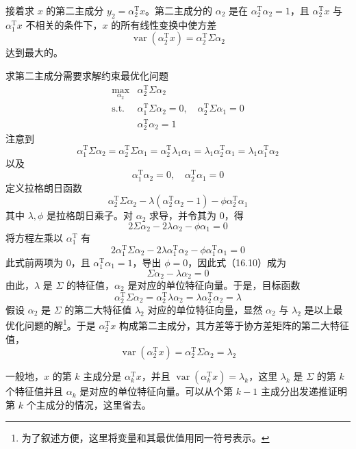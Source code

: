 \documentclass[UTF8, 12pt, fontset=fandol, oneside]{ctexart}
\begin{document}
接着求 $x$ 的第二主成分 $y_2=\alpha_2^{\mathrm{T}}x$。第二主成分的 $\alpha_2$ 是在 $\alpha_2^{\mathrm{T}}\alpha_2=1$，且 $\alpha_2^{\mathrm{T}}x$ 与 $\alpha_1^{\mathrm{T}}x$ 不相关的条件下，$x$ 的所有线性变换中使方差
\[
\operatorname{var}(\alpha_2^{\mathrm{T}}x)=\alpha_2^{\mathrm{T}}\Sigma\alpha_2
\]
达到最大的。

求第二主成分需要求解约束最优化问题
\begin{equation}
\begin{array}{ll}
\displaystyle\max_{\alpha_2} & \alpha_2^{\mathrm{T}}\Sigma\alpha_2\\[0.4em]
\mathrm{s.t.} & \alpha_1^{\mathrm{T}}\Sigma\alpha_2=0,\quad \alpha_2^{\mathrm{T}}\Sigma\alpha_1=0\\
& \alpha_2^{\mathrm{T}}\alpha_2=1
\end{array}
\tag{16.9}
\end{equation}
注意到
\[
\alpha_1^{\mathrm{T}}\Sigma\alpha_2=\alpha_2^{\mathrm{T}}\Sigma\alpha_1
=\alpha_2^{\mathrm{T}}\lambda_1\alpha_1
=\lambda_1\alpha_2^{\mathrm{T}}\alpha_1
=\lambda_1\alpha_1^{\mathrm{T}}\alpha_2
\]
以及
\[
\alpha_1^{\mathrm{T}}\alpha_2=0,\quad \alpha_2^{\mathrm{T}}\alpha_1=0
\]
定义拉格朗日函数
\[
\alpha_2^{\mathrm{T}}\Sigma\alpha_2-\lambda(\alpha_2^{\mathrm{T}}\alpha_2-1)-\phi\alpha_2^{\mathrm{T}}\alpha_1
\]
其中 $\lambda,\phi$ 是拉格朗日乘子。对 $\alpha_2$ 求导，并令其为 0，得
\begin{equation}
2\Sigma\alpha_2-2\lambda\alpha_2-\phi\alpha_1=0
\tag{16.10}
\end{equation}
将方程左乘以 $\alpha_1^{\mathrm{T}}$ 有
\[
2\alpha_1^{\mathrm{T}}\Sigma\alpha_2-2\lambda\alpha_1^{\mathrm{T}}\alpha_2-\phi\alpha_1^{\mathrm{T}}\alpha_1=0
\]
此式前两项为 0，且 $\alpha_1^{\mathrm{T}}\alpha_1=1$，导出 $\phi=0$，因此式（16.10）成为
\[
\Sigma\alpha_2-\lambda\alpha_2=0
\]
由此，$\lambda$ 是 $\Sigma$ 的特征值，$\alpha_2$ 是对应的单位特征向量。于是，目标函数
\[
\alpha_2^{\mathrm{T}}\Sigma\alpha_2=\alpha_2^{\mathrm{T}}\lambda\alpha_2=\lambda\alpha_2^{\mathrm{T}}\alpha_2=\lambda
\]
假设 $\alpha_2$ 是 $\Sigma$ 的第二大特征值 $\lambda_2$ 对应的单位特征向量，显然 $\alpha_2$ 与 $\lambda_2$ 是以上最优化问题的解\footnote{为了叙述方便，这里将变量和其最优值用同一符号表示。}。于是 $\alpha_2^{\mathrm{T}}x$ 构成第二主成分，其方差等于协方差矩阵的第二大特征值，
\begin{equation}
\operatorname{var}(\alpha_2^{\mathrm{T}}x)=\alpha_2^{\mathrm{T}}\Sigma\alpha_2=\lambda_2
\tag{16.11}
\end{equation}

一般地，$x$ 的第 $k$ 主成分是 $\alpha_k^{\mathrm{T}}x$，并且 $\operatorname{var}(\alpha_k^{\mathrm{T}}x)=\lambda_k$，这里 $\lambda_k$ 是 $\Sigma$ 的第 $k$ 个特征值并且 $\alpha_k$ 是对应的单位特征向量。可以从个第 $k-1$ 主成分出发递推证明第 $k$ 个主成分的情况，这里省去。
\end{document}
